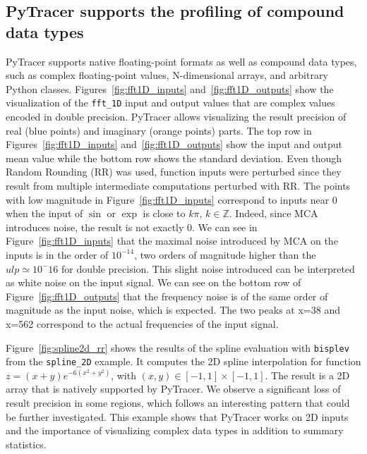 \documentclass[10pt,journal,compsoc]{IEEEtran}
\newcommand{\pytracer}[0]{PyTracer\xspace}
\begin{document}
\subsection{\pytracer supports the profiling of compound data types}

PyTracer supports native floating-point formats as well as compound data types,
such as complex floating-point values, N-dimensional arrays, and arbitrary
Python classes. Figures~\ref{fig:fft1D_inputs} and~\ref{fig:fft1D_outputs} show
the visualization of the \texttt{fft\_1D} input and output values that are
complex values encoded in double precision. PyTracer allows visualizing the
result precision of real (blue points) and imaginary (orange points) parts. The
top row in Figures~\ref{fig:fft1D_inputs} and~\ref{fig:fft1D_outputs} show the
input and output mean value while the bottom row shows the standard
deviation. Even though Random Rounding (RR) was used, function inputs were
perturbed since they result from multiple intermediate computations perturbed
with RR. The points with low magnitude in Figure~\ref{fig:fft1D_inputs}
correspond to inputs near 0 when the input of $\sin$ or $\exp$ is close to
$k\pi$, $k \in \mathbb{Z}$. Indeed, since MCA introduces noise, the result is
not exactly 0. We can see in Figure~\ref{fig:fft1D_inputs} that the maximal
noise introduced by MCA on the inputs is in the order of $10^{-14}$, two orders
of magnitude higher than the $ulp \simeq 10^-16$ for double precision. This
slight noise introduced can be interpreted as white noise on the input signal.
We can see on the bottom row of Figure~\ref{fig:fft1D_outputs} that the
frequency noise is of the same order of magnitude as the input noise, which is
expected. The two peaks at x=38 and x=562 correspond to the actual frequencies
of the input signal.

Figure~\ref{fig:spline2d_rr} shows the results of the spline evaluation with
\texttt{bisplev} from the \texttt{spline\_2D} example. It computes the 2D spline
interpolation for function $z=(x+y)e^{-6(x^2+y^2)}$, with $(x,y) \in
    [-1,1]\times[-1,1]$. The result is a 2D array that is natively supported by
PyTracer. We observe a significant loss of result precision in some regions,
which follows an interesting pattern that could be further investigated.
This example shows that \pytracer works on 2D inputs and the importance of
visualizing complex data types in addition to summary statistics.
\end{document}
